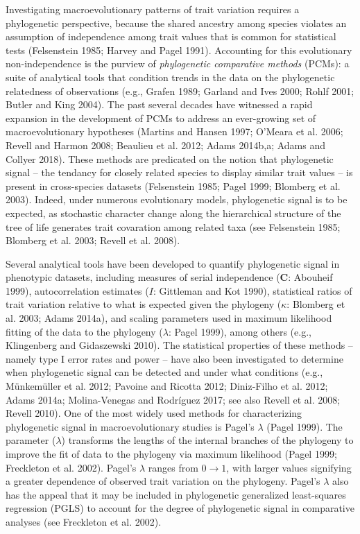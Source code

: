 \documentclass[
]{article}
\begin{document}
Investigating macroevolutionary patterns of trait variation requires a
phylogenetic perspective, because the shared ancestry among species
violates an assumption of independence among trait values that is common
for statistical tests (Felsenstein 1985; Harvey and Pagel 1991).
Accounting for this evolutionary non-independence is the purview of
\emph{phylogenetic comparative methods} (PCMs): a suite of analytical
tools that condition trends in the data on the phylogenetic relatedness
of observations (e.g., Grafen 1989; Garland and Ives 2000; Rohlf 2001;
Butler and King 2004). The past several decades have witnessed a rapid
expansion in the development of PCMs to address an ever-growing set of
macroevolutionary hypotheses (Martins and Hansen 1997; O'Meara et al.
2006; Revell and Harmon 2008; Beaulieu et al. 2012; Adams 2014b,a; Adams
and Collyer 2018). These methods are predicated on the notion that
phylogenetic signal -- the tendancy for closely related species to
display similar trait values -- is present in cross-species datasets
(Felsenstein 1985; Pagel 1999; Blomberg et al. 2003). Indeed, under
numerous evolutionary models, phylogenetic signal is to be expected, as
stochastic character change along the hierarchical structure of the tree
of life generates trait covaration among related taxa (see Felsenstein
1985; Blomberg et al. 2003; Revell et al. 2008). \hfill\break

Several analytical tools have been developed to quantify phylogenetic
signal in phenotypic datasets, including measures of serial independence
(\(\mathbf{C}\): Abouheif 1999), autocorrelation estimates (\(I\):
Gittleman and Kot 1990), statistical ratios of trait variation relative
to what is expected given the phylogeny (\(\kappa\): Blomberg et al.
2003; Adams 2014a), and scaling parameters used in maximum likelihood
fitting of the data to the phylogeny (\(\lambda\): Pagel 1999), among
others (e.g., Klingenberg and Gidaszewski 2010). The statistical
properties of these methods -- namely type I error rates and power --
have also been investigated to determine when phylogenetic signal can be
detected and under what conditions (e.g., Münkemüller et al. 2012;
Pavoine and Ricotta 2012; Diniz-Filho et al. 2012; Adams 2014a;
Molina-Venegas and Rodríguez 2017; see also Revell et al. 2008; Revell
2010). One of the most widely used methods for characterizing
phylogenetic signal in macroevolutionary studies is Pagel's \(\lambda\)
(Pagel 1999). The parameter (\(\lambda\)) transforms the lengths of the
internal branches of the phylogeny to improve the fit of data to the
phylogeny via maximum likelihood (Pagel 1999; Freckleton et al. 2002).
Pagel's \(\lambda\) ranges from \(0\to1\), with larger values signifying
a greater dependence of observed trait variation on the phylogeny.
Pagel's \(\lambda\) also has the appeal that it may be included in
phylogenetic generalized least-squares regression (PGLS) to account for
the degree of phylogenetic signal in comparative analyses (see
Freckleton et al. 2002). \hfill\break 
\end{document}
